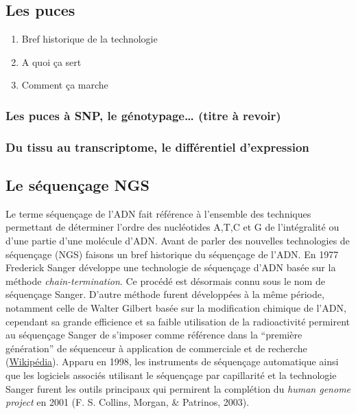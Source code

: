 \documentclass[12pt,twoside]{reedthesis}
\providecommand{\tightlist}{%
  \setlength{\itemsep}{0pt}\setlength{\parskip}{0pt}}
\theoremstyle{definition}
\theoremstyle{definition}
\theoremstyle{remark}
\begin{document}
  \subsection{Les puces}\label{les-puces}
  
  \begin{enumerate}
  \def\labelenumi{\arabic{enumi}.}
  \tightlist
  \item
    Bref historique de la technologie\\
  \item
    A quoi ça sert
  \item
    Comment ça marche
  \end{enumerate}
  
  \subsubsection{Les puces à SNP, le génotypage\ldots{} (titre à
  revoir)}\label{les-puces-a-snp-le-genotypage-titre-a-revoir}
  
  \subsubsection{Du tissu au transcriptome, le différentiel
  d'expression}\label{du-tissu-au-transcriptome-le-differentiel-dexpression}
  
  \subsection{Le séquençage NGS}\label{le-sequencage-ngs}
  
  Le terme séquençage de l'ADN fait référence à l'ensemble des techniques
  permettant de déterminer l'ordre des nucléotides A,T,C et G de
  l'intégralité ou d'une partie d'une molécule d'ADN. Avant de parler des
  nouvelles technologies de séquençage (NGS) faisons un bref historique du
  séquençage de l'ADN. En 1977 Frederick Sanger développe une technologie
  de séquençage d'ADN basée sur la méthode \emph{chain-termination}. Ce
  procédé est désormais connu sous le nom de séquençage Sanger. D'autre
  méthode furent développées à la même période, notamment celle de Walter
  Gilbert basée sur la modification chimique de l'ADN, cependant sa grande
  efficience et sa faible utilisation de la radioactivité permirent au
  séquençage Sanger de s'imposer comme référence dans la ``première
  génération'' de séquenceur à application de commerciale et de recherche
  (\href{http://en.wikipedia.org/wiki/DNA_sequencing}{Wikipédia}). Apparu
  en 1998, les instruments de séquençage automatique ainsi que les
  logiciels associés utilisant le séquençage par capillarité et la
  technologie Sanger furent les outils principaux qui permirent la
  complétion du \emph{human genome project} en 2001 (F. S. Collins,
  Morgan, \& Patrinos, 2003).
  
\end{document}
